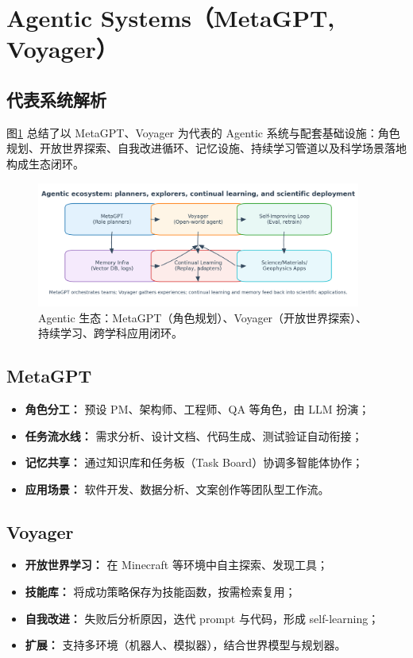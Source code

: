 \documentclass[UTF8,zihao=-4]{ctexart}
\begin{document}
\section{Agentic Systems（MetaGPT, Voyager）}
\subsection{代表系统解析}
图\ref{fig:agentic_ecosystem_cn} 总结了以 MetaGPT、Voyager 为代表的 Agentic 系统与配套基础设施：角色规划、开放世界探索、自我改进循环、记忆设施、持续学习管道以及科学场景落地构成生态闭环。
\begin{figure}[H]
  \centering
  \includegraphics[width=0.95\textwidth]{agentic_ecosystem.png}
  \caption{Agentic 生态：MetaGPT（角色规划）、Voyager（开放世界探索）、持续学习、跨学科应用闭环。}
  \label{fig:agentic_ecosystem_cn}
\end{figure}

\subsection{MetaGPT}
\begin{itemize}
  \item \textbf{角色分工：} 预设 PM、架构师、工程师、QA 等角色，由 LLM 扮演；
  \item \textbf{任务流水线：} 需求分析、设计文档、代码生成、测试验证自动衔接；
  \item \textbf{记忆共享：} 通过知识库和任务板（Task Board）协调多智能体协作；
  \item \textbf{应用场景：} 软件开发、数据分析、文案创作等团队型工作流。
\end{itemize}

\subsection{Voyager}
\begin{itemize}
  \item \textbf{开放世界学习：} 在 Minecraft 等环境中自主探索、发现工具；
  \item \textbf{技能库：} 将成功策略保存为技能函数，按需检索复用；
  \item \textbf{自我改进：} 失败后分析原因，迭代 prompt 与代码，形成 self-learning；
  \item \textbf{扩展：} 支持多环境（机器人、模拟器），结合世界模型与规划器。
\end{itemize}
\end{document}
